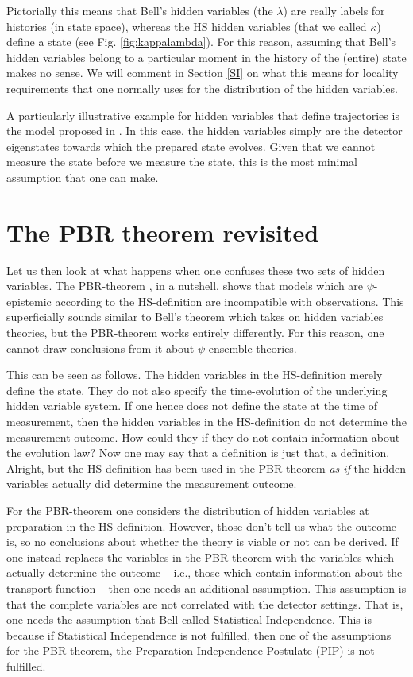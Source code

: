 \documentclass[superscriptaddress,twocolumn,floatfix,nofootinbib]{revtex4-2}
\begin{document}
Pictorially this means that Bell's hidden variables (the $\lambda$) are really labels for histories (in state space), whereas the HS hidden variables (that we called $\kappa$) define a state (see Fig. \ref{fig:kappalambda}). For this reason, assuming that Bell's hidden variables belong to a particular moment in the history of the (entire) state makes no sense. We will comment in Section \ref{SI} on what this means for locality requirements that one normally uses for the distribution of the hidden variables. 

A particularly illustrative example for hidden variables that define trajectories is the model proposed in \cite{Palmer2009ISP,Palmer2020Discretization}. In this case, the hidden variables simply are the detector eigenstates towards which the prepared state evolves. Given that we cannot measure the state before we measure the state, this is the most minimal assumption that one can make. 

\section{The PBR theorem revisited}
\label{PBRsection}

Let us then look at what happens when one confuses these two sets of hidden variables.
The {\sc PBR}-theorem \cite{Pusey2012Reality}, in a nutshell, shows that models which are $\psi$-epistemic according to the HS-definition are incompatible with observations. This superficially sounds similar to Bell's theorem which takes on hidden variables theories, but the {\sc PBR}-theorem works entirely differently. For this reason, one cannot draw conclusions from it about $\psi$-ensemble theories. 

This can be seen as follows. The hidden variables in the HS-definition merely define the state. They do not also specify the time-evolution of the underlying hidden variable system. If one hence does not define the state at the time of measurement, then the hidden variables in the HS-definition do not determine the measurement outcome. How could they if they do not contain information about the evolution law? 
Now one may say that a definition is just that, a definition. Alright, but the HS-definition has been used in the {\sc PBR}-theorem \emph{as if} the hidden variables actually did determine the measurement outcome. 

For the {\sc PBR}-theorem one considers the distribution of hidden variables at preparation in the HS-definition. However, those don't tell us what the outcome is, so no conclusions about whether the theory is viable or not can be derived. If one instead replaces the variables in the {\sc PBR}-theorem with the variables which actually determine the outcome -- i.e., those which contain information about the transport function -- then one needs an additional assumption. This assumption is that the complete variables are not correlated with the detector settings. That is, one needs the assumption that Bell called Statistical Independence. This is because if Statistical Independence is not fulfilled, then one of the assumptions for the {\sc PBR}-theorem, the Preparation Independence Postulate ({\sc PIP}) is not fulfilled.
\end{document}
